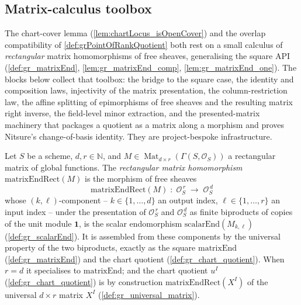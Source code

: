 \subsection{Matrix-calculus toolbox}

The chart-cover lemma (\cref{lem:chartLocus_isOpenCover}) and the overlap compatibility of
\cref{def:grPointOfRankQuotient} both rest on a small calculus of \emph{rectangular} matrix
homomorphisms of free sheaves, generalising the square API
(\cref{def:gr_matrixEnd}, \cref{lem:gr_matrixEnd_comp}, \cref{lem:gr_matrixEnd_one}). The
blocks below collect that toolbox: the bridge to the square case, the identity and
composition laws, injectivity of the matrix presentation, the column-restriction law, the
affine splitting of epimorphisms of free sheaves and the resulting matrix right inverse, the
field-level minor extraction, and the presented-matrix machinery that packages a quotient as
a matrix along a morphism and proves Nitsure's change-of-basis identity. They are
project-bespoke infrastructure.


\begin{definition}


  \label{def:gr_matrixEndRect}
  Let \(S\) be a scheme, \(d, r \in \mathbb{N}\), and
  \(M \in \operatorname{Mat}_{d \times r}(\Gamma(S, \mathcal{O}_S))\) a rectangular matrix
  of global functions. The \emph{rectangular matrix homomorphism}
  \(\mathrm{matrixEndRect}(M)\) is the morphism of free sheaves
  \[
    \mathrm{matrixEndRect}(M) \;:\; \mathcal{O}_S^{\,r}
      \;\longrightarrow\; \mathcal{O}_S^{\,d}
  \]
  whose \((k,\ell)\)-component -- \(k \in \{1,\dots,d\}\) an output index,
  \(\ell \in \{1,\dots,r\}\) an input index -- under the presentation of
  \(\mathcal{O}_S^{\,r}\) and \(\mathcal{O}_S^{\,d}\) as finite biproducts of copies of the
  unit module \(\mathbf 1\), is the scalar endomorphism \(\mathrm{scalarEnd}(M_{k,\ell})\)
  (\cref{def:gr_scalarEnd}). It is assembled from these components by the universal property
  of the two biproducts, exactly as the square \(\mathrm{matrixEnd}\)
  (\cref{def:gr_matrixEnd}) and the chart quotient (\cref{def:gr_chart_quotient}). When
  \(r = d\) it specialises to \(\mathrm{matrixEnd}\); and the chart quotient \(u^I\)
  (\cref{def:gr_chart_quotient}) is by construction \(\mathrm{matrixEndRect}(X^I)\) of the
  universal \(d \times r\) matrix \(X^I\) (\cref{def:gr_universal_matrix}).
\end{definition}

